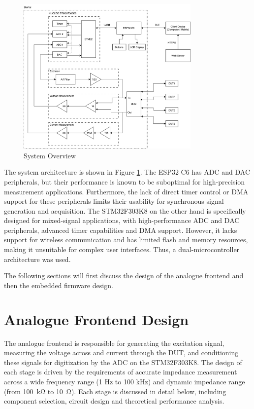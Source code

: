 \begin{figure}[H]
    \centering
    \includegraphics[width=0.8\textwidth]{FullSystemOverview.png}
    \caption{System Overview}
    \label{fig:system_overview} 
\end{figure}
The system architecture is shown in Figure \ref{fig:system_overview}. The ESP32 C6 has \ac{ADC} and \ac{DAC} peripherals, but their performance is known to be suboptimal for high-precision measurement applications. Furthermore, the lack of direct timer control or \ac{DMA} support for these peripherals limits their usability for synchronous signal generation and acquisition. The STM32F303K8 on the other hand is specifically designed for mixed-signal applications, with high-performance \ac{ADC} and \ac{DAC} peripherals, advanced timer capabilities and \ac{DMA} support. However, it lacks support for wireless communication and has limited flash and memory resources, making it unsuitable for complex user interfaces. Thus, a dual-microcontroller architecture was used.

The following sections will first discuss the design of the analogue frontend and then the embedded firmware design.
\section{Analogue Frontend Design}
The analogue frontend is responsible for generating the excitation signal, measuring the voltage across and current through the \ac{DUT}, and conditioning these signals for digitization by the \ac{ADC} on the STM32F303K8. The design of each stage is driven by the requirements of accurate impedance measurement across a wide frequency range (1 Hz to 100 kHz) and dynamic impedance range (from \SI{100}{\kilo\ohm} to \SI{10}{\ohm}). Each stage is discussed in detail below, including component selection, circuit design and theoretical performance analysis.

